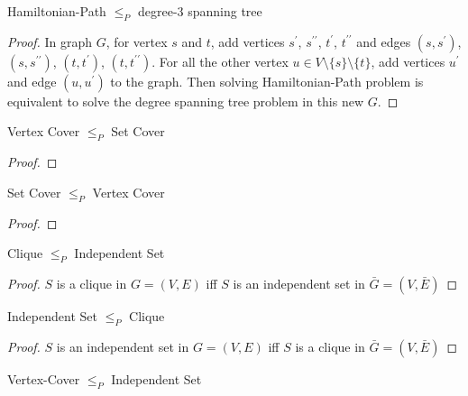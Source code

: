 				\begin{lemma}
					Hamiltonian-Path $\le_P$ degree-3 spanning tree
				\end{lemma}

				\begin{proof}
					In graph $G$, for vertex $s$ and $t$, add vertices $s^\prime$, $s^{\prime\prime}$, $t^\prime$, $t^{\prime\prime}$ and edges $(s, s^\prime)$, $(s, s^{\prime\prime})$, $(t, t^\prime)$, $(t, t^{\prime\prime})$. For all the other vertex $u \in V\setminus \{s\} \setminus \{t\}$, add vertices $u^\prime$ and edge $(u, u^\prime)$ to the graph. Then solving Hamiltonian-Path problem is equivalent to solve the degree spanning tree problem in this new $G$.
				\end{proof}

				\begin{lemma}
					Vertex Cover $\le_P$ Set Cover
				\end{lemma}

				\begin{proof}
					
				\end{proof}

				\begin{lemma}
					Set Cover $\le_P$ Vertex Cover
				\end{lemma}

				\begin{proof}
					
				\end{proof}

				\begin{lemma}
					Clique $\le_P$ Independent Set
				\end{lemma}

				\begin{proof}
					$S$ is a clique in $G = (V, E)$ iff $S$ is an independent set in $\bar{G} = (V, \bar{E})$
				\end{proof}

				\begin{lemma}
					Independent Set $\le_P$ Clique
				\end{lemma}

				\begin{proof}
					$S$ is an independent set in $G = (V, E)$ iff $S$ is a clique in $\bar{G} = (V, \bar{E})$
				\end{proof}

				\begin{lemma}
					Vertex-Cover $\le_P$ Independent Set
				\end{lemma}

